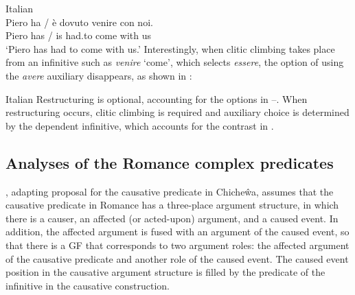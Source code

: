\documentclass[output=paper,hidelinks]{langscibook}
\begin{document}
\ea\label{ex:Romance:56}   Italian \citep[19]{Rizzi:Issues}\\
\gll
Piero ha / è dovuto venire con noi.\\
       Piero has / is had.to come with us\\
\glt   `Piero has had to come with us.'\z
Interestingly, when clitic climbing takes place from an infinitive such as \textit{venire} `come', which selects \textit{essere}, the option of using the \textit{avere} auxiliary disappears, as shown in :

\ea\label{ex:Romance:57}   Italian  \citep[21]{Rizzi:Issues}
\z\z
Restructuring is optional, accounting for the options in --. When restructuring occurs, clitic climbing is required and auxiliary choice is determined by the dependent infinitive, which accounts for the contrast in .

\subsection{Analyses of the Romance complex predicates}
\label{sec:Romance:4.2}

\citet{alsina1996the-role}, adapting  proposal for the causative predicate in Chiche\^wa, assumes that the causative predicate in Romance has a three-place argument structure, in which there is a causer, an affected (or acted-upon) argument, and a caused event. In addition, the affected argument is fused with an argument of the caused event, so that there is a GF that corresponds to two argument roles: the affected argument of the causative predicate and another role of the caused event. The caused event position in the causative argument structure is filled by the predicate of the infinitive in the causative construction.
\end{document}

